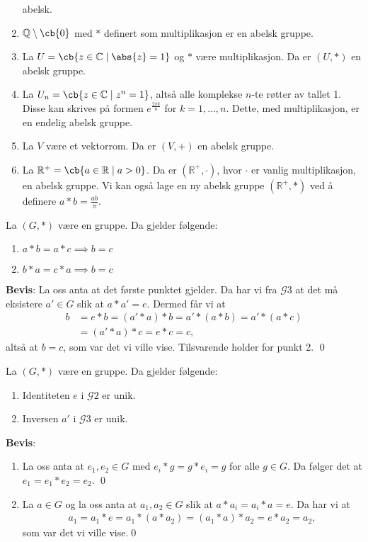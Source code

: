 \begin{enumerate}
	      abelsk.
	\item $\mathbb{Q}\setminus \cb{0}$ med $*$ definert som multiplikasjon er en abelsk
	      gruppe.
	\item La $U=\cb{z\in\mathbb{C}\mid \abs{z}=1}$ og $*$ være multiplikasjon. Da er
	      $(U, *)$ en abelsk gruppe.
	\item La $U_n=\cb{z\in\mathbb{C}\mid z^n = 1}$, altså alle komplekse $n$-te røtter
	      av tallet 1. Disse kan skrives på formen $e^{\frac{2\pi k}{n}}$ for $k=1,\dots, n$.
	      Dette, med multiplikasjon, er en endelig abelsk gruppe.
	\item La $V$ være et vektorrom. Da er $(V, +)$ en abelsk gruppe.
	\item La $\mathbb{R}^+ = \cb{a\in \mathbb{R}\mid a > 0}$. Da er
	      $(\mathbb{R}^+, \cdot)$, hvor $\cdot$ er vanlig multiplikasjon, en abelsk gruppe.
	      Vi kan også lage en ny abelsk gruppe $(\mathbb{R}^+, *)$ ved å definere
	      $a*b = \frac{ab}{\pi}$.
\end{enumerate}

\begin{theorem*}{4.15}{} \label{thm:jarl}
	La $(G, *)$ være en gruppe. Da gjelder følgende:
	\begin{enumerate}
		\item $a * b = a * c \implies b = c$
		\item $b * a = c * a \implies b = c$
	\end{enumerate}
\end{theorem*}

\textbf{Bevis}:
La oss anta at det første punktet gjelder. Da har vi fra $\mathscr{G}3$ at det må
eksistere $a'\in G$ slik at $a * a' = e$. Dermed får vi at
\begin{align}
	b & = e * b = (a' * a) * b = a' * (a * b) = a' * (a * c) \\
	  & = (a' * a) * c = e * c = c,
\end{align}
altså at $b = c$, som var det vi ville vise. Tilsvarende holder for punkt 2. \qed

\begin{theorem*}{4.17}{}
	La $(G, *)$ være en gruppe. Da gjelder følgende:
	\begin{enumerate}
		\item Identiteten $e$ i $\mathscr{G}2$ er unik.
		\item Inversen $a'$ i $\mathscr{G}3$ er unik.
	\end{enumerate}
\end{theorem*}
\textbf{Bevis}:
\begin{enumerate}
	\item La oss anta at $e_1, e_2 \in G$ med $e_i * g = g * e_i = g$ for alle $g\in G$.
	      Da følger det at $e_1 = e_1 * e_2 = e_2$. \qed
	\item La $a \in G$ og la oss anta at $a_1, a_2 \in G$ slik at
	      $a * a_i = a_i * a = e$. Da har vi at
	      \begin{align}
		      a_1 = a_1 * e = a_1 * (a * a_2) = (a_1 * a) * a_2 = e * a_2 = a_2,
	      \end{align}
	      som var det vi ville vise.\qed
\end{enumerate}

